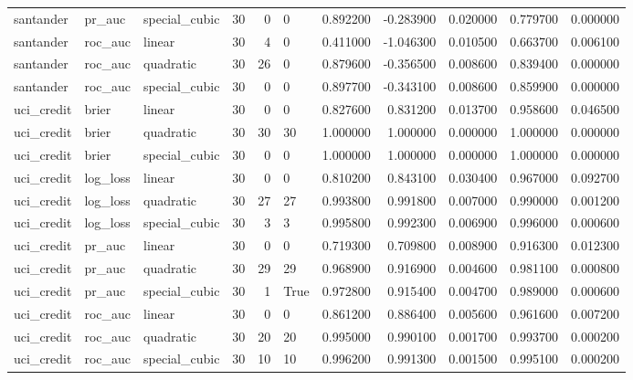 \begin{longtable}{lllrrlrrrrr}
santander & pr\_auc & special\_cubic & 30 & 0 & 0 & 0.892200 & -0.283900 & 0.020000 & 0.779700 & 0.000000 \\
santander & roc\_auc & linear & 30 & 4 & 0 & 0.411000 & -1.046300 & 0.010500 & 0.663700 & 0.006100 \\
santander & roc\_auc & quadratic & 30 & 26 & 0 & 0.879600 & -0.356500 & 0.008600 & 0.839400 & 0.000000 \\
santander & roc\_auc & special\_cubic & 30 & 0 & 0 & 0.897700 & -0.343100 & 0.008600 & 0.859900 & 0.000000 \\
uci\_credit & brier & linear & 30 & 0 & 0 & 0.827600 & 0.831200 & 0.013700 & 0.958600 & 0.046500 \\
uci\_credit & brier & quadratic & 30 & 30 & 30 & 1.000000 & 1.000000 & 0.000000 & 1.000000 & 0.000000 \\
uci\_credit & brier & special\_cubic & 30 & 0 & 0 & 1.000000 & 1.000000 & 0.000000 & 1.000000 & 0.000000 \\
uci\_credit & log\_loss & linear & 30 & 0 & 0 & 0.810200 & 0.843100 & 0.030400 & 0.967000 & 0.092700 \\
uci\_credit & log\_loss & quadratic & 30 & 27 & 27 & 0.993800 & 0.991800 & 0.007000 & 0.990000 & 0.001200 \\
uci\_credit & log\_loss & special\_cubic & 30 & 3 & 3 & 0.995800 & 0.992300 & 0.006900 & 0.996000 & 0.000600 \\
uci\_credit & pr\_auc & linear & 30 & 0 & 0 & 0.719300 & 0.709800 & 0.008900 & 0.916300 & 0.012300 \\
uci\_credit & pr\_auc & quadratic & 30 & 29 & 29 & 0.968900 & 0.916900 & 0.004600 & 0.981100 & 0.000800 \\
uci\_credit & pr\_auc & special\_cubic & 30 & 1 & True & 0.972800 & 0.915400 & 0.004700 & 0.989000 & 0.000600 \\
uci\_credit & roc\_auc & linear & 30 & 0 & 0 & 0.861200 & 0.886400 & 0.005600 & 0.961600 & 0.007200 \\
uci\_credit & roc\_auc & quadratic & 30 & 20 & 20 & 0.995000 & 0.990100 & 0.001700 & 0.993700 & 0.000200 \\
uci\_credit & roc\_auc & special\_cubic & 30 & 10 & 10 & 0.996200 & 0.991300 & 0.001500 & 0.995100 & 0.000200 \\
\end{longtable}\endgroup\addtocounter{table}{-1}
